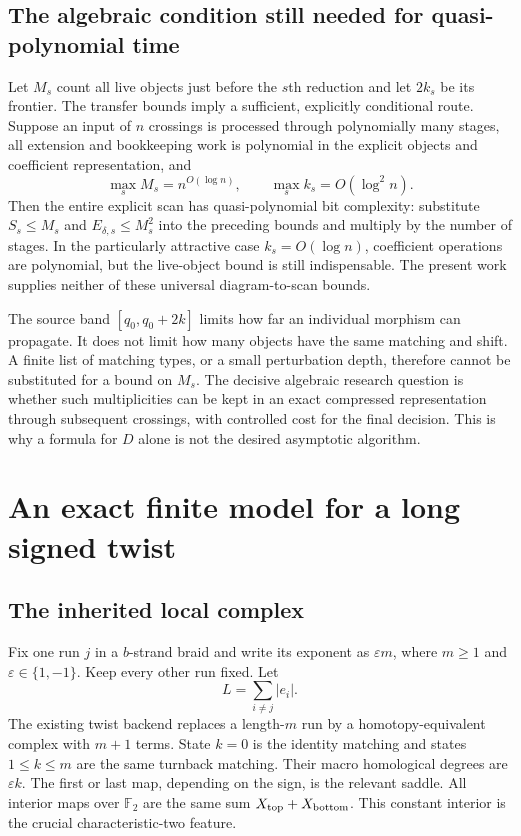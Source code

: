 \documentclass[11pt]{article}
\theoremstyle{definition}
\theoremstyle{remark}
\newcommand{\F}{\mathbb F_2}
\begin{document}
\subsection{The algebraic condition still needed for quasi-polynomial time}
Let $M_s$ count all live objects just before the $s$th reduction and let $2k_s$ be its frontier. The transfer bounds imply a sufficient, explicitly conditional route. Suppose an input of $n$ crossings is processed through polynomially many stages, all extension and bookkeeping work is polynomial in the explicit objects and coefficient representation, and
\[
 \max_s M_s=n^{O(\log n)},\qquad
 \max_s k_s=O(\log^2 n).
\]
Then the entire explicit scan has quasi-polynomial bit complexity: substitute $S_s\le M_s$ and $E_{\delta,s}\le M_s^2$ into the preceding bounds and multiply by the number of stages. In the particularly attractive case $k_s=O(\log n)$, coefficient operations are polynomial, but the live-object bound is still indispensable. The present work supplies neither of these universal diagram-to-scan bounds.

The source band $[q_0,q_0+2k]$ limits how far an individual morphism can propagate. It does not limit how many objects have the same matching and shift. A finite list of matching types, or a small perturbation depth, therefore cannot be substituted for a bound on $M_s$. The decisive algebraic research question is whether such multiplicities can be kept in an exact compressed representation through subsequent crossings, with controlled cost for the final decision. This is why a formula for $D$ alone is not the desired asymptotic algorithm.

\section{An exact finite model for a long signed twist}
\label{sec:tail}

\subsection{The inherited local complex}
Fix one run $j$ in a $b$-strand braid and write its exponent as $\varepsilon m$, where $m\ge1$ and $\varepsilon\in\{1,-1\}$. Keep every other run fixed. Let
\[
 L=\sum_{i\ne j}|e_i|.
\]
The existing twist backend replaces a length-$m$ run by a homotopy-equivalent complex with $m+1$ terms. State $k=0$ is the identity matching and states $1\le k\le m$ are the same turnback matching. Their macro homological degrees are $\varepsilon k$. The first or last map, depending on the sign, is the relevant saddle. All interior maps over $\F$ are the same sum $X_{\rm top}+X_{\rm bottom}$. This constant interior is the crucial characteristic-two feature.
\end{document}
